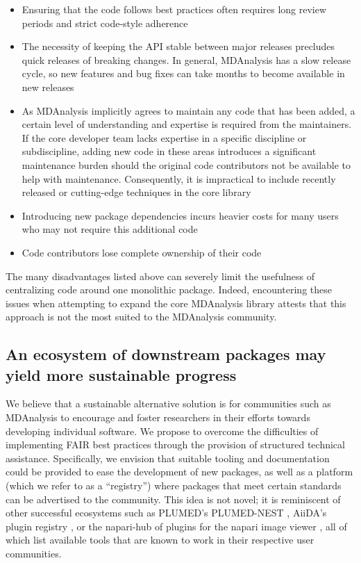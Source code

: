 \documentclass[9pt,whitepaper]{livecoms}
\begin{document}
\begin{itemize}
    \item Ensuring that the code follows best practices often requires long review periods and strict code-style adherence
    \item The necessity of keeping the API stable between major releases precludes quick releases of breaking changes. In general, MDAnalysis has a slow release cycle, so new features and bug fixes can take months to become available in new releases
    \item As MDAnalysis implicitly agrees to maintain any code that has been added, a certain level of understanding and expertise is required from the maintainers. If the core developer team lacks expertise in a specific discipline or subdiscipline, adding new code in these areas introduces a significant maintenance burden should the original code contributors not be available to help with maintenance. Consequently, it is impractical to include recently released or cutting-edge techniques in the core library
    \item Introducing new package dependencies incurs heavier costs for many users who may not require this additional code
    \item Code contributors lose complete ownership of their code
\end{itemize}

The many disadvantages listed above can severely limit the usefulness of centralizing code around one monolithic package. Indeed, encountering these issues when attempting to expand the core MDAnalysis library attests that this approach is not the most suited to the MDAnalysis community.

\subsection{An ecosystem of downstream packages may yield more sustainable progress}
\label{sec:ecosystemadvantages}

We believe that a sustainable alternative solution is for communities such as MDAnalysis to encourage and foster researchers in their efforts towards developing individual software. We propose to overcome the difficulties of implementing FAIR best practices through the provision of structured technical assistance. Specifically, we envision that suitable tooling and documentation could be provided to ease the development of new packages, as well as a platform (which we refer to as a “registry”) where packages that meet certain standards can be advertised to the community. This idea is not novel; it is reminiscent of other successful ecosystems such as PLUMED’s PLUMED-NEST \cite{bonomi_promoting_2019}, AiiDA’s plugin registry \cite{noauthor_aiida_nodate}, or the napari-hub \cite{chan_zuckerberg_initiative_napari_nodate} of plugins for the napari image viewer \cite{sofroniew_napari_2022}, all of which list available tools that are known to work in their respective user communities.
\end{document}
